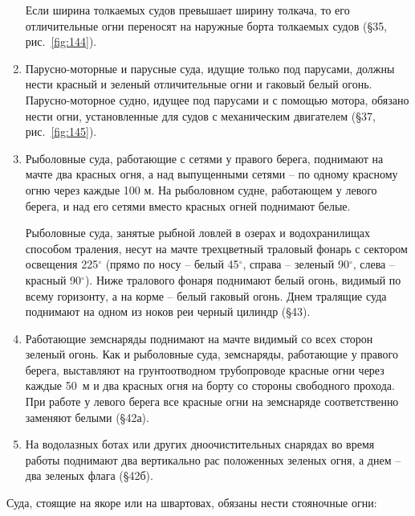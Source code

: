 \documentclass[a4paper, 12pt, twoside, final]{scrbook}
\begin{document}
\begin{enumerate}
Если ширина толкаемых судов превышает ширину толкача, то его отличительные огни переносят на наружные борта толкаемых судов (\S 35, рис.~\ref{fig:144}).

\item Парусно-моторные и парусные суда, идущие только под парусами, должны нести красный и зеленый отличительные огни и гаковый белый огонь. Парусно-моторное судно, идущее под парусами и с помощью мотора, обязано нести огни, установленные для судов с механическим двигателем (\S 37, рис.~\ref{fig:145}).

\item Рыболовные суда, работающие с сетями у правого берега, поднимают на мачте два красных огня, а над выпущенными сетями \--- по одному красному огню через каждые 100 м. На рыболовном судне, работающем у левого берега, и над его сетями вместо красных огней поднимают белые.

Рыболовные суда, занятые рыбной ловлей в озерах и водохранилищах способом траления, несут на мачте трехцветный траловый фонарь с сектором освещения 225$^\circ$ (прямо по носу \--- белый 45$^\circ$, справа \--- зеленый 90$^\circ$, слева \--- красный 90$^\circ$). Ниже тралового фонаря поднимают белый огонь, видимый по всему горизонту, а на корме \--- белый гаковый огонь. Днем тралящие суда поднимают на одном из ноков реи черный цилиндр (\S 43).

\item Работающие земснаряды поднимают на мачте видимый со всех сторон зеленый огонь. Как и рыболовные суда, земснаряды, работающие у правого берега, выставляют на грунтоотводном трубопроводе красные огни через каждые 50~м и два красных огня на борту со стороны свободного прохода. При работе у левого берега все красные огни на земснаряде соответственно заменяют белыми (\S 42а).

\item На водолазных ботах или других дноочистительных снарядах во время работы поднимают два вертикально рас положенных зеленых огня, а днем \--- два зеленых флага (\S 42б).
\end{enumerate}

Суда, стоящие на якоре или на швартовах, обязаны нести стояночные огни:
\end{document}
